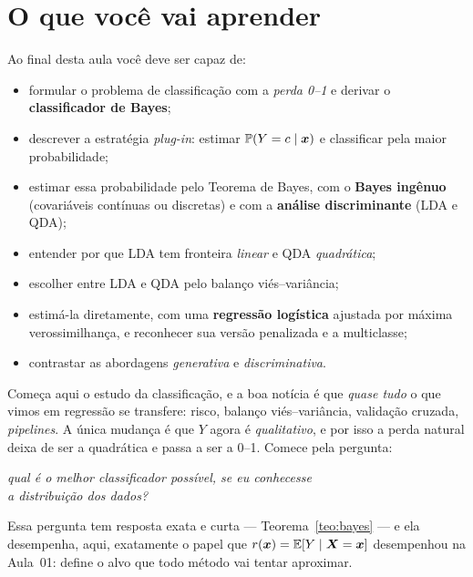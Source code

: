 \documentclass[11pt,a4paper]{article}
\title{}
\date{}
\begin{document}

\section*{O que você vai aprender}
Ao final desta aula você deve ser capaz de:
\begin{itemize}[leftmargin=1.4cm]
  \item formular o problema de classificação com a \emph{perda 0--1} e derivar o
        \textbf{classificador de Bayes};
  \item descrever a estratégia \emph{plug-in}: estimar $\mathbb{P}(Y=c\mid\bm{x})$ e
        classificar pela maior probabilidade;
  \item estimar essa probabilidade pelo Teorema de Bayes, com o \textbf{Bayes
        ingênuo} (covariáveis contínuas ou discretas) e com a \textbf{análise
        discriminante} (LDA e QDA);
  \item entender por que LDA tem fronteira \emph{linear} e QDA \emph{quadrática};
  \item escolher entre LDA e QDA pelo balanço viés--variância;
  \item estimá-la diretamente, com uma \textbf{regressão logística} ajustada por
        máxima verossimilhança, e reconhecer sua versão penalizada e a multiclasse;
  \item contrastar as abordagens \emph{generativa} e \emph{discriminativa}.
\end{itemize}

\noindent
Começa aqui o estudo da classificação, e a boa notícia é que \emph{quase tudo} o
que vimos em regressão se transfere: risco, balanço viés--variância, validação
cruzada, \emph{pipelines}. A única mudança é que $Y$ agora é \emph{qualitativo}, e
por isso a perda natural deixa de ser a quadrática e passa a ser a 0--1. Comece
pela pergunta:

\begin{center}\itshape
  qual é o melhor classificador possível, se eu conhecesse\\
  a distribuição dos dados?
\end{center}

\noindent
Essa pergunta tem resposta exata e curta --- Teorema~\ref{teo:bayes} --- e ela
desempenha, aqui, exatamente o papel que $r(\bm{x})=\mathbb{E}[Y\mid\bm{X}=\bm{x}]$ desempenhou na
Aula~01: define o alvo que todo método vai tentar aproximar.
\end{document}
